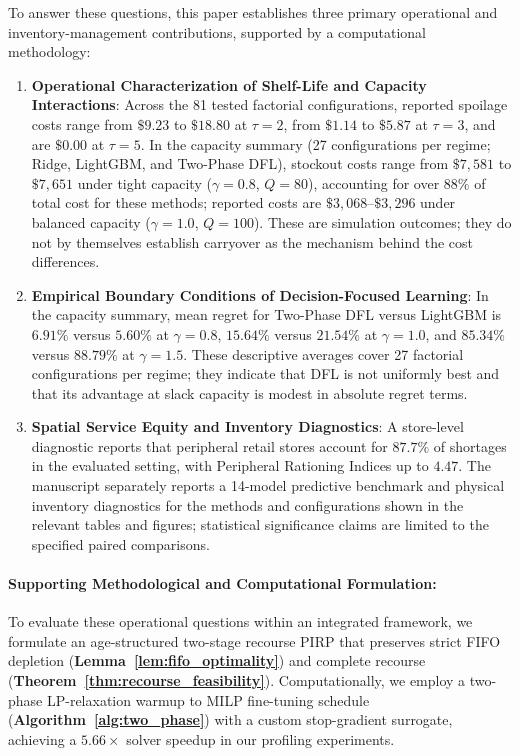 \documentclass[11pt,a4paper]{article}
\theoremstyle{definition}
\theoremstyle{remark}
\begin{document}
To answer these questions, this paper establishes three primary operational and inventory-management contributions, supported by a computational methodology:
\begin{enumerate}[leftmargin=*]
    \item \textbf{Operational Characterization of Shelf-Life and Capacity Interactions}: Across the 81 tested factorial configurations, reported spoilage costs range from $\$9.23$ to $\$18.80$ at $\tau=2$, from $\$1.14$ to $\$5.87$ at $\tau=3$, and are $\$0.00$ at $\tau=5$. In the capacity summary (27 configurations per regime; Ridge, LightGBM, and Two-Phase DFL), stockout costs range from $\$7,581$ to $\$7,651$ under tight capacity ($\gamma=0.8$, $Q=80$), accounting for over $88\%$ of total cost for these methods; reported costs are $\$3,068$--$\$3,296$ under balanced capacity ($\gamma=1.0$, $Q=100$). These are simulation outcomes; they do not by themselves establish carryover as the mechanism behind the cost differences.
    \item \textbf{Empirical Boundary Conditions of Decision-Focused Learning}: In the capacity summary, mean regret for Two-Phase DFL versus LightGBM is $6.91\%$ versus $5.60\%$ at $\gamma=0.8$, $15.64\%$ versus $21.54\%$ at $\gamma=1.0$, and $85.34\%$ versus $88.79\%$ at $\gamma=1.5$. These descriptive averages cover 27 factorial configurations per regime; they indicate that DFL is not uniformly best and that its advantage at slack capacity is modest in absolute regret terms.
    \item \textbf{Spatial Service Equity and Inventory Diagnostics}: A store-level diagnostic reports that peripheral retail stores account for $87.7\%$ of shortages in the evaluated setting, with Peripheral Rationing Indices up to $4.47$. The manuscript separately reports a 14-model predictive benchmark and physical inventory diagnostics for the methods and configurations shown in the relevant tables and figures; statistical significance claims are limited to the specified paired comparisons.
\end{enumerate}

\paragraph{Supporting Methodological and Computational Formulation:}
To evaluate these operational questions within an integrated framework, we formulate an age-structured two-stage recourse PIRP that preserves strict FIFO depletion (\textbf{Lemma~\ref{lem:fifo_optimality}}) and complete recourse (\textbf{Theorem~\ref{thm:recourse_feasibility}}). Computationally, we employ a two-phase LP-relaxation warmup to MILP fine-tuning schedule (\textbf{Algorithm~\ref{alg:two_phase}}) with a custom stop-gradient surrogate, achieving a $5.66\times$ solver speedup in our profiling experiments.
\end{document}
